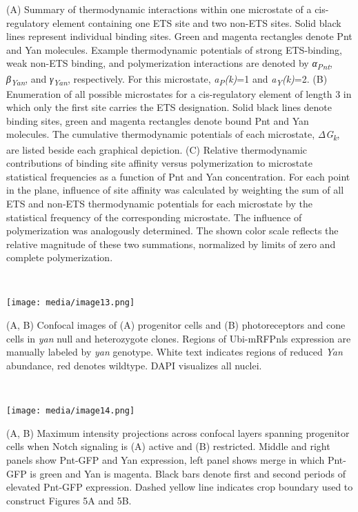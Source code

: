 (A) Summary of thermodynamic interactions within one microstate of a cis-regulatory element containing one ETS site and two non-ETS sites. Solid black lines represent individual binding sites. Green and magenta rectangles denote Pnt and Yan molecules. Example thermodynamic potentials of strong ETS-binding, weak non-ETS binding, and polymerization interactions are denoted by \emph{α\textsubscript{Pnt}}, \emph{β\textsubscript{Yan}}, and \emph{γ\textsubscript{Yan}}, respectively. For this microstate, \emph{a\textsubscript{P}(k)}=1 and \emph{a\textsubscript{Y}(k)}=2. (B) Enumeration of all possible microstates for a cis-regulatory element of length 3 in which only the first site carries the ETS designation. Solid black lines denote binding sites, green and magenta rectangles denote bound Pnt and Yan molecules. The cumulative thermodynamic potentials of each microstate, \emph{ΔG\textsubscript{k}}, are listed beside each graphical depiction. (C) Relative thermodynamic contributions of binding site affinity versus polymerization to microstate statistical frequencies as a function of Pnt and Yan concentration. For each point in the plane, influence of site affinity was calculated by weighting the sum of all ETS and non-ETS thermodynamic potentials for each microstate by the statistical frequency of the corresponding microstate. The influence of polymerization was analogously determined. The shown color scale reflects the relative magnitude of these two summations, normalized by limits of zero and complete polymerization.

\textbf{\\
}

\texttt{[image: media/image13.png]}

(A, B) Confocal images of (A) progenitor cells and (B) photoreceptors and cone cells in \emph{yan} null and heterozygote clones. Regions of Ubi-mRFPnls expression are manually labeled by \emph{yan} genotype. White text indicates regions of reduced \emph{Yan} abundance, red denotes wildtype. DAPI visualizes all nuclei.

\textbf{\\
}

\texttt{[image: media/image14.png]}

(A, B) Maximum intensity projections across confocal layers spanning progenitor cells when Notch signaling is (A) active and (B) restricted. Middle and right panels show Pnt-GFP and Yan expression, left panel shows merge in which Pnt-GFP is green and Yan is magenta. Black bars denote first and second periods of elevated Pnt-GFP expression. Dashed yellow line indicates crop boundary used to construct Figures 5A and 5B.

